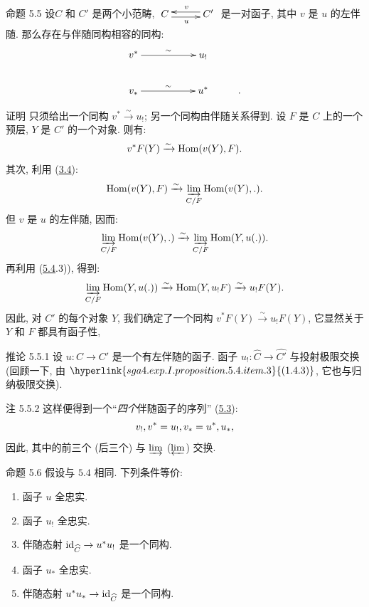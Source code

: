 \begin{enonce*}{命题 5.5}
设\pageoriginale $C$ 和 $C'$ 是两个小范畴,
$\xymatrix@C=1cm{
 C \ar@<-2.5pt>[r]_{u} & C'\ar@<-2.5pt>[l]_{v}
}$ 是一对函子, 其中 $v$ 是 $u$ 的左伴随. 那么存在与伴随同构相容的同构:
\[
\xymatrix@R=.75cm{
v^{\ast} \ar[rr]^{\sim}&    & u_!      &\\
v_{\ast} \ar[rr]^{\sim}&    & u^{\ast} & . }
\]
\end{enonce*}

\begin{enonce*}[remark]{证明}
只须给出一个同构 $v^\ast\xrightarrow{\sim}
u_{!}$; 另一个同构由伴随关系得到.
设 $F$ 是 $C$ 上的一个预层, $Y$ 是 $C'$ 的一个对象. 则有:
$$
v^\ast F(Y)\xrightarrow{\sim} \operatorname{Hom}(v(Y),F){}.
$$
其次, 利用 (\hyperref[I.prop3.4]{3.4}):
$$
\operatorname{Hom}(v(Y),F)\xrightarrow{\sim} \varinjlim_{C/F} \operatorname{Hom}(v(Y),.){}.
$$
但 $v$ 是 $u$ 的左伴随, 因而:
$$
\varinjlim_{C/F}\operatorname{Hom}(v(Y),.)\xrightarrow{\sim}\varinjlim_{C/F}\operatorname{Hom}(Y,u(.)){}.
$$
再利用 (\hyperref[I.prop5.4]{5.4}.3)), 得到:
$$
\varinjlim_{C/F}\operatorname{Hom}(Y,u(.))\xrightarrow{\sim}
\operatorname{Hom}(Y,u_{!}F)\xrightarrow{\sim} u_{!}F(Y){}.
$$
因此, 对 $C'$ 的每个对象 $Y$, 我们确定了一个同构
$v^\ast F(Y)\xrightarrow{\sim} u_{!}F(Y)$, 它显然关于 $Y$ 和 $F$
都具有函子性, \cqfd
\end{enonce*}

\begin{enonce*}{推论 5.5.1}
设 $u:C\rightarrow C'$ 是一个有左伴随的函子.
函子 $u_{!}:\widehat{C}\rightarrow
\widehat{C'}$ 与投射极限交换
(回顾一下, 由 $\hyperlink{sga4.exp.I.proposition.5.4.item.3}{(1.4.3)}$,
它也与归纳极限交换).
\end{enonce*}

\begin{enonce*}[remark]{注 5.5.2}
这样\pageoriginale 便得到一个“\emph{四个}伴随函子的序列”
(\cf \hyperref[I.sec5.3]{5.3}):
$$
v_{!}, v^\ast=u_{!}, v_\ast = u^\ast, u_\ast{},
$$
因此, 其中的前三个 (\resp 后三个) 与 $\varinjlim$ (\resp $\varprojlim$) 交换.
\end{enonce*}

\begin{enonce*}{命题 5.6}
假设与 $\hyperref[I.prop5.4]{5.4}$ 相同. 下列条件等价:
\begin{enumerate}
\renewcommand{\theenumi}{\roman{enumi}}
\renewcommand{\labelenumi}{\theenumi)}
\item 函子 $u$ 全忠实.

\item 函子 $u_{!}$ 全忠实.

\item 伴随态射
  $\operatorname{id}_{\widehat{C}}\rightarrow u^\ast u_{!}$ 是一个同构.

\item 函子 $u_\ast$ 全忠实.

\item 伴随态射 $u^\ast u_\ast\rightarrow
  \operatorname{id}_{\widehat{C}}$ 是一个同构.
\end{enumerate}
\end{enonce*}

